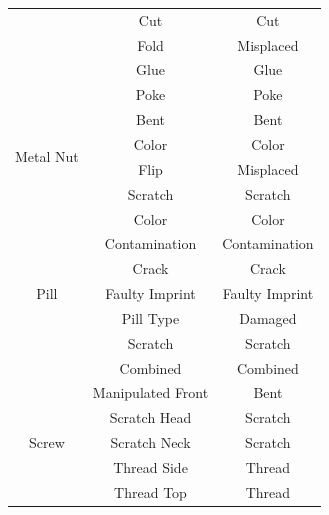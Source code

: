 \begin{table}
\begin{tabular}{@{}ccc@{}}
 & Cut & Cut \\
 & Fold & Misplaced \\
 & Glue & Glue \\
 & Poke & Poke \\
\midrule
\multirow{4}{*}{Metal Nut} & Bent & Bent \\
 & Color & Color \\
 & Flip & Misplaced \\
 & Scratch & Scratch \\
\midrule
\multirow{7}{*}{Pill} & Color & Color \\
 & Contamination & Contamination \\
 & Crack & Crack \\
 & Faulty Imprint & Faulty Imprint \\
 & Pill Type & Damaged \\
 & Scratch & Scratch \\
 & Combined & Combined \\
\midrule
\multirow{5}{*}{Screw} & Manipulated Front & Bent \\
 & Scratch Head & Scratch \\
 & Scratch Neck & Scratch \\
 & Thread Side & Thread \\
 & Thread Top & Thread \\
\bottomrule
\end{tabular}
\end{table}

